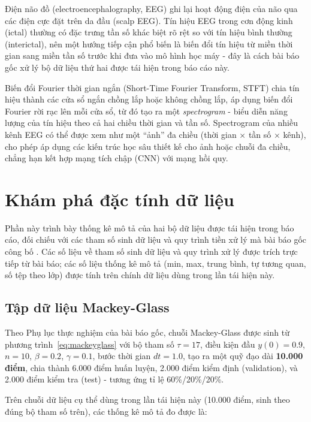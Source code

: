 Điện não đồ (electroencephalography, EEG) ghi lại hoạt động điện của não qua các điện cực đặt
trên da đầu (scalp EEG). Tín hiệu EEG trong cơn động kinh (ictal) thường có đặc trưng tần số
khác biệt rõ rệt so với tín hiệu bình thường (interictal), nên một hướng tiếp cận phổ biến là
biến đổi tín hiệu từ miền thời gian sang miền tần số trước khi đưa vào mô hình học máy - đây
là cách bài báo gốc xử lý bộ dữ liệu thứ hai được tái hiện trong báo cáo này.

Biến đổi Fourier thời gian ngắn (Short-Time Fourier Transform, STFT) chia tín hiệu thành các
cửa sổ ngắn chồng lắp hoặc không chồng lắp, áp dụng biến đổi Fourier rời rạc lên mỗi cửa sổ, từ
đó tạo ra một \textit{spectrogram} - biểu diễn năng lượng của tín hiệu theo cả hai chiều
thời gian và tần số. Spectrogram của nhiều kênh EEG có thể được xem như một ``ảnh'' đa chiều
(thời gian × tần số × kênh), cho phép áp dụng các kiến trúc học sâu thiết kế cho ảnh hoặc chuỗi
đa chiều, chẳng hạn kết hợp mạng tích chập (CNN) với mạng hồi quy.

\section{Khám phá đặc tính dữ liệu}
\label{sec:eda}

Phần này trình bày thống kê mô tả của hai bộ dữ liệu được tái hiện trong báo cáo, đối chiếu
với các tham số sinh dữ liệu và quy trình tiền xử lý mà bài báo gốc công bố
\cite{gunasekaran2025fgl}. Các số liệu về tham số sinh dữ liệu và quy trình xử lý được trích
trực tiếp từ bài báo; các số liệu thống kê mô tả (min, max, trung bình, tự tương quan, số tệp
theo lớp) được tính trên chính dữ liệu dùng trong lần tái hiện này.

\subsection{Tập dữ liệu Mackey-Glass}

Theo Phụ lục thực nghiệm của bài báo gốc, chuỗi Mackey-Glass được sinh từ
phương trình~\eqref{eq:mackeyglass} với bộ tham số $\tau = 17$, điều kiện đầu $y(0) = 0.9$,
$n = 10$, $\beta = 0.2$, $\gamma = 0.1$, bước thời gian $dt = 1.0$, tạo ra một quỹ đạo dài
\textbf{10.000 điểm}, chia thành 6.000 điểm huấn luyện, 2.000 điểm kiểm định (validation), và
2.000 điểm kiểm tra (test) - tương ứng tỉ lệ 60\%/20\%/20\%.

Trên chuỗi dữ liệu cụ thể dùng trong lần tái hiện này (10.000 điểm, sinh theo đúng bộ tham số
trên), các thống kê mô tả đo được là:

